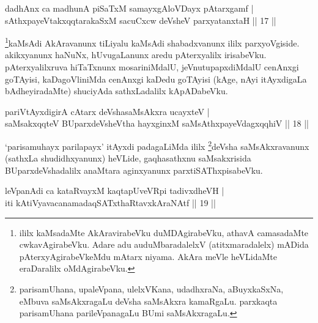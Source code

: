 \begin{shl}
dadhAnx ca madhunA piSaTxM samayxgAloVDayx pAtarxgamf | \\
sAthxpayeVtakxqqtarakaSxM sacuCxcw deVsheV parxyatanxtaH \hfill|| 17 || 
\end{shl}

\begin{artha}
\footnote{ililx kaMsadaMte AkAravirabeVku duMDAgirabeVku, athavA camasadaMte cwkavAgirabeVku. Adare adu auduMbaradalelxV (atitxmaradalelx) mADida pAterxyAgirabeVkeMdu mAtarx niyama. AkAra meVle heVLidaMte eraDaralilx oMdAgirabeVku.}kaMsAdi AkAravanunx tiLiyalu kaMsAdi shabadxvanunx ililx parxyoVgiside. akikx\-yanunx haNuNx, hUvugaLanunx aredu pAterxyalilx irisabeVku. pAterxyalilxruva \-hiTaTxnunx mosariniMdalU, jeVnutupapxdiMdalU cenAnxgi goTAyisi, kaDagoVliniMda \break cenAnxgi kaDedu goTAyisi (kAge, nAyi itAyxdigaLa bAdheyiradaMte) shuciyAda sathxLadalilx kApADabeVku.
\end{artha}


\begin{shl}
pariVtAyxdigirA cAtarx deVshasaMsAkxra ucayxteV | \\
saMsakxqqteV BUparxdeVsheV\s tha hayxginxM saMsAthxpayeVdagxqqhiV \hfill|| 18 || 
\end{shl}

\begin{artha}
`parisamuhayx parilapayx' itAyxdi padagaLiMda ililx \footnote{parisamUhana, upaleVpana, ulelxVKana, udadhxraNa, aBuyxkaSxNa, eMbuva saMsAkxragaLu deVsha saMsAkxra kamaRgaLu. parxkaqta parisamUhana parileVpanagaLu BUmi saMsAkxragaLu.}deVsha saMsAkxravanunx (sathxLa shudidhxyanunx) heVLide, gaqhasathxnu saMsakxrisida BUparxdeVshadalilx anaMtara aginxyanunx parxtiSAThxpisabeVku.
\end{artha}

\begin{shl}
leVpanAdi ca kataRvayxM kaqtapUveVR\s pi tadivxdheVH | \\
\footnotemark[2]iti kAtiVyavacanamadaqSATxthaRtavxkAraNAtf \hfill|| 19 || 
\end{shl}

